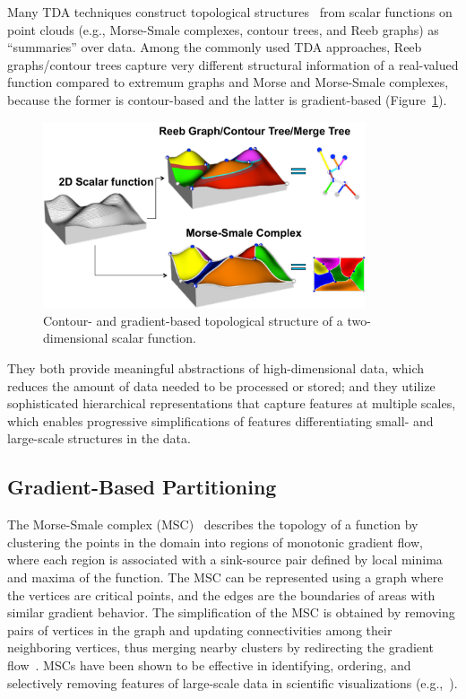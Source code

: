 Many TDA techniques construct topological structures~\cite{Reeb1946,Smale1961} from scalar functions on point clouds (e.g., Morse-Smale complexes, contour trees, and Reeb graphs) as ``summaries'' over data.
%
Among the commonly used TDA approaches, Reeb graphs/contour trees capture very different structural information of a real-valued function compared to extremum graphs and Morse and Morse-Smale complexes, because the former is contour-based and the latter is gradient-based (Figure~\ref{fig:topo-structure}).

\begin{figure}[b]
  \centering
  \includegraphics[width=0.85\textwidth]{figs/chap3/topostructure}
  \caption[Contour and Gradient-based Structures]{Contour- and gradient-based
  topological structure of a two-dimensional scalar function.}
  \label{fig:topo-structure}
\end{figure}

They both provide meaningful abstractions of high-dimensional data, which reduces the amount of data needed to be processed or stored; and they utilize sophisticated hierarchical representations that capture features at multiple scales, which enables progressive simplifications of features differentiating small- and large-scale structures in the data.

\subsection{Gradient-Based Partitioning}
The Morse-Smale complex (MSC)~\cite{EdelsbrunnerHarerNatarajan2003,EdelsbrunnerHarerZomorodian2003} describes the topology of a function by clustering the points in the domain into regions of monotonic gradient flow, where each region is associated with a sink-source pair defined by local minima and maxima of the function.
%
The MSC can be represented using a graph where the vertices are critical points, and the edges are the boundaries of areas with similar gradient behavior.
%
The simplification of the MSC is obtained by removing pairs of vertices in the graph and updating connectivities among their neighboring vertices, thus merging nearby clusters by redirecting the gradient flow~\cite{ComicDeFloriani2011,GuntherReininghausSeidel2013,IuricichFugacciDeFloriani2015}.
%
MSCs have been shown to be effective in identifying, ordering, and selectively removing features of large-scale data in scientific visualizations (e.g.,~\cite{BremerEdelsbrunnerHamann2004,GyulassyBremerPascucci2008,GyulassyNatarajanPascucci2005}).

